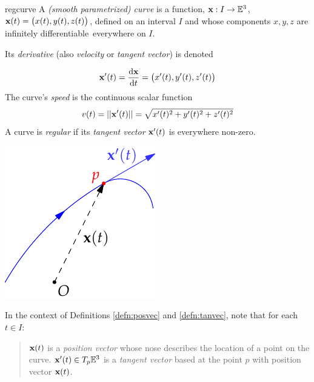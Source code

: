 \clearpage




\begin{defn}{}{regcurve}
A \emph{(smooth parametrized) curve} is a function, $\vx:I\to\E^3$, $\vx(t)=\bigl(x(t),y(t),z(t)\bigr)$, defined on an interval $I$ and whose components $x,y,z$ are infinitely differentiable\footnotemark\ everywhere on $I$.\par
Its \emph{derivative} (also \emph{velocity} or \emph{tangent vector}) is denoted\par
\begin{minipage}[t]{0.7\linewidth}\vspace{-10pt}
\[\vx'(t)=\diff[\vx]{t}=\bigl(x'(t),y'(t),z'(t)\bigr)\]
The curve's \emph{speed} is the continuous scalar function 
\[v(t)=\Nm{\vx'(t)}=\sqrt{x'(t)^2+y'(t)^2+z'(t)^2}\]
A curve is \emph{regular} if its \emph{tangent vector} $\vx'(t)$ is everywhere non-zero. 
\end{minipage}\hfill\begin{minipage}[t]{0.29\linewidth}\vspace{0pt}
\flushright\includegraphics{curves-tangent-vector}
\end{minipage}
\end{defn}



In the context of Definitions \ref{defn:posvec} and \ref{defn:tanvec}, note that for each $t\in I$:
\begin{quote}
$\vx(t)$ is a \emph{position vector} whose nose describes the location of a point on the curve.\smallbreak
$\vx'(t)\in T_p\E^3$ is a \emph{tangent vector} based at the point $p$ with position vector $\vx(t)$.
\end{quote}

